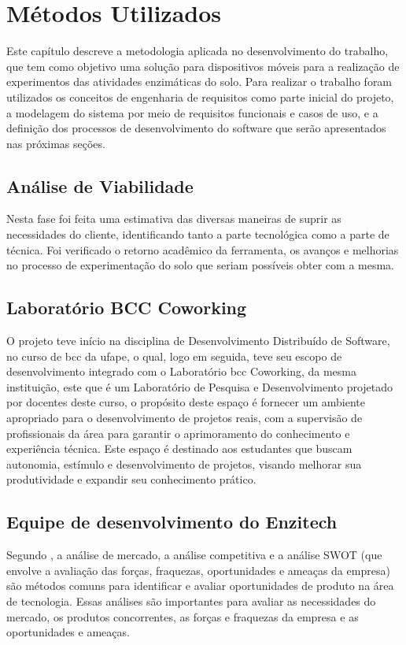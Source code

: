 \chapter{Métodos Utilizados}\label{ch:metodos}
Este capítulo descreve a metodologia aplicada no desenvolvimento do trabalho, que tem como objetivo uma solução para dispositivos móveis para a realização de experimentos das atividades enzimáticas do solo. Para realizar o trabalho foram utilizados os conceitos de engenharia de requisitos como parte inicial do projeto, a modelagem do sistema por meio de requisitos funcionais e casos de uso, e a definição dos processos de desenvolvimento do software que serão apresentados nas próximas seções.

\section{Análise de Viabilidade}\label{sec:analise_viabilidade}
Nesta fase foi feita uma estimativa das diversas maneiras de suprir as necessidades do cliente, identificando tanto a parte tecnológica como a parte de técnica. Foi verificado o retorno acadêmico da ferramenta, os avanços e melhorias no processo de experimentação do solo que seriam possíveis obter com a mesma.

\section{Laboratório BCC Coworking}\label{sec:lab}
O projeto teve início na disciplina de Desenvolvimento Distribuído de Software, no curso de \ac{bcc} da \ac{ufape}, o qual, logo em seguida, teve seu escopo de desenvolvimento integrado com o Laboratório \ac{bcc} Coworking, da mesma instituição, este que é um Laboratório de Pesquisa e Desenvolvimento projetado por docentes deste curso, o propósito deste espaço é fornecer um ambiente apropriado para o desenvolvimento de projetos reais, com a supervisão de profissionais da área para garantir o aprimoramento do conhecimento e experiência técnica. Este espaço é destinado aos estudantes que buscam autonomia, estímulo e desenvolvimento de projetos, visando melhorar sua produtividade e expandir seu conhecimento prático.

\section{Equipe de desenvolvimento do Enzitech}
Segundo \cite{pressman2016engenharia}, a análise de mercado, a análise competitiva e a análise SWOT (que envolve a avaliação das forças, fraquezas, oportunidades e ameaças da empresa) são métodos comuns para identificar e avaliar oportunidades de produto na área de tecnologia. Essas análises são importantes para avaliar as necessidades do mercado, os produtos concorrentes, as forças e fraquezas da empresa e as oportunidades e ameaças. 

